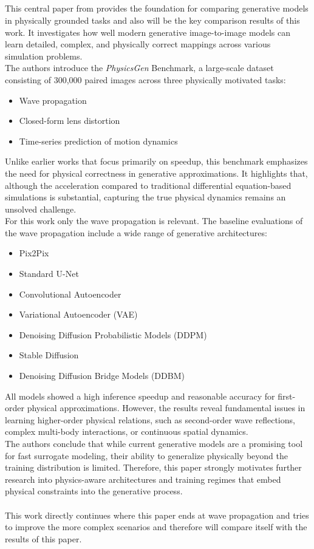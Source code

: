 		\subsection{}
			This central paper from \citeauthor{martin_spitznagel_physicsgen_2025} provides the foundation for comparing generative models in physically grounded tasks and also will be the key comparison results of this work. It investigates how well modern generative image-to-image models can learn detailed, complex, and physically correct mappings across various simulation problems.\\
			The authors introduce the \textit{PhysicsGen} Benchmark, a large-scale dataset consisting of 300{,}000 paired images across three physically motivated tasks:
			\begin{itemize}
				\item Wave propagation
				\item Closed-form lens distortion
				\item Time-series prediction of motion dynamics
			\end{itemize}
			Unlike earlier works that focus primarily on speedup, this benchmark emphasizes the need for physical correctness in generative approximations. It highlights that, although the acceleration compared to traditional differential equation-based simulations is substantial, capturing the true physical dynamics remains an unsolved challenge.\\
			For this work only the wave propagation is relevant. The baseline evaluations of the wave propagation include a wide range of generative architectures:
			\begin{itemize}
				\item Pix2Pix
				\item Standard U-Net
				\item Convolutional Autoencoder
				\item Variational Autoencoder (VAE)
				\item Denoising Diffusion Probabilistic Models (DDPM)
				\item Stable Diffusion
				\item Denoising Diffusion Bridge Models (DDBM)
			\end{itemize}
			All models showed a high inference speedup and reasonable accuracy for first-order physical approximations. However, the results reveal fundamental issues in learning higher-order physical relations, such as second-order wave reflections, complex multi-body interactions, or continuous spatial dynamics.\\
			The authors conclude that while current generative models are a promising tool for fast surrogate modeling, their ability to generalize physically beyond the training distribution is limited. Therefore, this paper strongly motivates further research into physics-aware architectures and training regimes that embed physical constraints into the generative process.\\
			\\
			This work directly continues where this paper ends at wave propagation and tries to improve the more complex scenarios and therefore will compare itself with the results of this paper.
			
